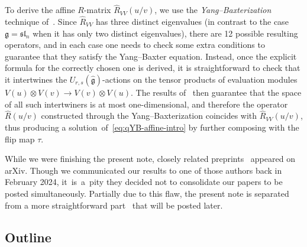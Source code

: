 \documentclass[10pt,a4paper]{amsart}
\numberwithin{equation}{section}
\newcommand{\fg}{\mathfrak{g}}
\newcommand{\ssl}{\mathfrak{sl}}
\newcommand{\UU}{U_{r,s}(\widehat{\fg})}
\begin{document}
To derive the affine $R$-matrix $\hat{R}_{VV}(u/v)$, we use the \emph{Yang--Baxterization} technique of~\cite{GWX}. Since $\hat{R}_{VV}$ has three distinct eigenvalues (in contrast to the case $\fg=\ssl_n$ when it has only two distinct eigenvalues), there are 12 possible resulting operators, and in each case one needs to check some extra conditions to guarantee that they satisfy the Yang--Baxter equation. Instead, once the explicit formula for the correctly chosen one is derived, it is straightforward to check that it intertwines the $\UU$-actions on the tensor products of evaluation modules $V(u)\otimes V(v)\to V(v)\otimes V(u)$.
The results of~\cite{Jim} then guarantee that the space of all such intertwiners is at most one-dimensional, and therefore the operator $\hat{R}(u/v)$ constructed through the Yang--Baxterization coincides with $\hat{R}_{VV}(u/v)$, thus producing a solution~of~\eqref{eq:qYB-affine-intro} by further composing with the flip map $\tau$.

While we were finishing the present note, closely related preprints~\cite{HXZ1,HJZ,HXZ2} appeared on arXiv. Though we communicated our results to one of those authors back in February 2024, it~is~a~pity they decided not to consolidate our papers to be posted simultaneously. Partially due to this flaw, the present note is separated from a more straightforward part~\cite{MT2} that will be posted later.

\subsection{Outline}%
\end{document}
